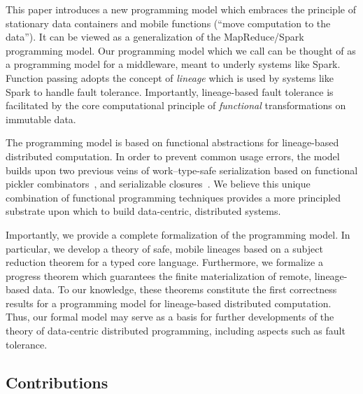 \documentclass{jfp1}
\begin{document}
This paper introduces a new programming model which embraces the principle of
stationary data containers and mobile functions (``move computation to the data''). 
It can be viewed as a generalization of the MapReduce/Spark programming model. 
Our programming model which we call {\em\FP} can be thought of as a 
programming model for a middleware, 
meant to underly systems like Spark. Function passing adopts the concept of
{\em lineage} which is used by systems like Spark to handle fault tolerance. 
Importantly, lineage-based fault tolerance is facilitated by the core computational 
principle of {\em functional} transformations on immutable data.

The programming model is based on functional abstractions for lineage-based
distributed computation. In order to prevent common usage errors, the model
builds upon two previous veins of work--type-safe serialization based on
functional pickler combinators~\cite{Kennedy2004,Elsman2005,Pickling,AliceML}, and
serializable closures~\cite{CloudHaskell,Spores}. We believe this unique
combination of functional programming techniques provides a more principled
substrate upon which to build data-centric, distributed systems.

Importantly, we provide a complete formalization of the programming
model. In particular, we develop a theory of safe, mobile lineages
based on a subject reduction theorem for a typed core
language. Furthermore, we formalize a progress theorem which
guarantees the finite materialization of remote, lineage-based data.
To our knowledge, these theorems constitute the first correctness
results for a programming model for lineage-based distributed
computation.  Thus, our formal model may serve as a basis for further
developments of the theory of data-centric distributed programming,
including aspects such as fault tolerance.

\subsection{Contributions}
\end{document}
